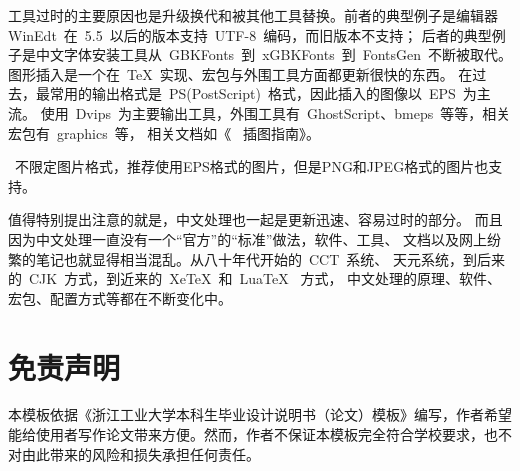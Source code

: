 工具过时的主要原因也是升级换代和被其他工具替换。前者的典型例子是编辑器
WinEdt~在~5.5~以后的版本支持~UTF-8~编码，而旧版本不支持；
后者的典型例子是中文字体安装工具从~GBKFonts~到~xGBKFonts~到~FontsGen~不断被取代。
图形插入是一个在~\TeX~实现、宏包与外围工具方面都更新很快的东西。
在过去，最常用的输出格式是~PS(PostScript)~格式，因此插入的图像以~EPS~为主流。
使用~Dvips~为主要输出工具，外围工具有~GhostScript、bmeps~等等，相关宏包有~graphics~等，
相关文档如《\LaTeXe{}~ 插图指南》。

\XeLaTeX~不限定图片格式，推荐使用EPS格式的图片，但是PNG和JPEG格式的图片也支持。

值得特别提出注意的就是，中文处理也一起是更新迅速、容易过时的部分。
而且因为中文处理一直没有一个“官方”的“标准”做法，软件、工具、
文档以及网上纷繁的笔记也就显得相当混乱。从八十年代开始的~CCT~系统、
天元系统，到后来的~CJK~方式，到近来的~XeTeX~和~LuaTeX~ 方式，
中文处理的原理、软件、宏包、配置方式等都在不断变化中。

\section{免责声明}

本模板依据《浙江工业大学本科生毕业设计说明书（论文）模板》编写，作者希望能给使用者写作论文带来方便。然而，作者不保证本模板完全符合学校要求，也不对由此带来的风险和损失承担任何责任。
